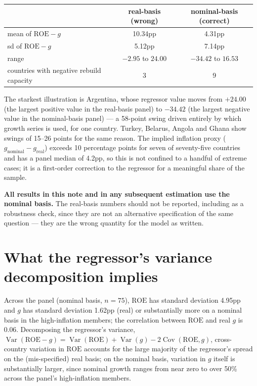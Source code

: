 \documentclass[11pt]{article}
\begin{document}
\begin{center}
\begin{tabular}{@{}lcc@{}}
\toprule
& real-basis (wrong) & nominal-basis (correct) \\
\midrule
mean of $\mathrm{ROE}-g$ & 10.34pp & 4.31pp \\
sd of $\mathrm{ROE}-g$    & 5.12pp  & 7.14pp \\
range                     & $-2.95$ to $24.00$ & $-34.42$ to $16.53$ \\
countries with negative rebuild capacity & 3 & 9 \\
\bottomrule
\end{tabular}
\end{center}

The starkest illustration is Argentina, whose regressor value moves from
$+24.00$ (the largest positive value in the real-basis panel) to
$-34.42$ (the largest negative value in the nominal-basis panel) --- a
58-point swing driven entirely by which growth series is used, for one
country. Turkey, Belarus, Angola and Ghana show swings of 15--26 points
for the same reason. The implied inflation proxy
($g_{\text{nominal}} - g_{\text{real}}$) exceeds 10 percentage points for
seven of seventy-five countries and has a panel median of 4.2pp, so this
is not confined to a handful of extreme cases; it is a first-order
correction to the regressor for a meaningful share of the sample.

\textbf{All results in this note and in any subsequent estimation use the
nominal basis.} The real-basis numbers should not be reported, including
as a robustness check, since they are not an alternative specification of
the same question --- they are the wrong quantity for the model as
written.

\section{What the regressor's variance decomposition implies}
\label{sec:decomp}

Across the panel (nominal basis, $n=75$), $\mathrm{ROE}$ has standard
deviation 4.95pp and $g$ has standard deviation 1.62pp (real) or
substantially more on a nominal basis in the high-inflation members; the
correlation between $\mathrm{ROE}$ and real $g$ is 0.06. Decomposing the
regressor's variance,
$\operatorname{Var}(\mathrm{ROE}-g) = \operatorname{Var}(\mathrm{ROE}) +
\operatorname{Var}(g) - 2\operatorname{Cov}(\mathrm{ROE},g)$, cross-country
variation in $\mathrm{ROE}$ accounts for the large majority of the
regressor's spread on the (mis-specified) real basis; on the nominal
basis, variation in $g$ itself is substantially larger, since nominal
growth ranges from near zero to over 50\% across the panel's
high-inflation members.
\end{document}
